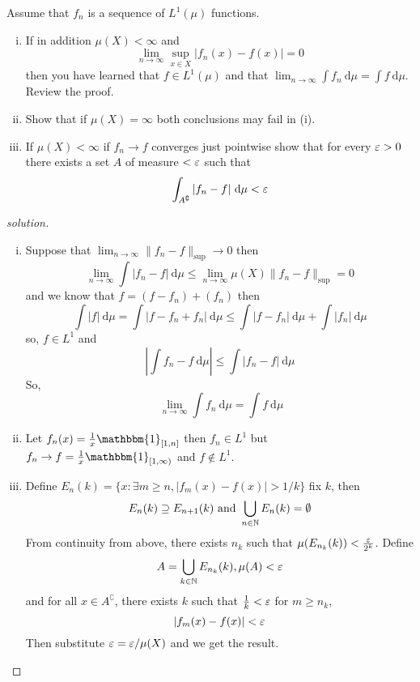 \begin{problem}
  Assume that $f_n$ is a sequence of $L^1(\mu)$ functions.
  \begin{enumerate}[(i)]
    \item If in addition $\mu(X) < \infty$ and 
    \[\lim_{n\to\infty}\sup_{x \in X} |f_n(x) - f(x)| = 0\]
    then you have learned that $f \in L^1(\mu)$ and that $\lim_{n\to\infty}\int f_n \ \mathrm{d}\mu = \int f\ \mathrm{d}\mu$.
    Review the proof.
    \item Show that if $\mu(X) = \infty$ both conclusions may fail in (i).
    \item If $\mu(X) < \infty$ if $f_n \to f$ converges just pointwise show that for every $\varepsilon > 0$
    there exists a set $A$ of measure $< \varepsilon$ such that 
    \[\int_{A^\complement} |f_n - f| \ \mathrm{d}\mu < \varepsilon\]
  \end{enumerate}
\end{problem}
\begin{proof}[solution]
  \begin{enumerate}[(i)]
    \item Suppose that $\lim_{n\to\infty} \|f_n - f\|_{\sup} \to 0$ then 
    \[\lim_{n\to\infty}\int |f_n - f| \ \mathrm{d}\mu \le \lim_{n\to\infty}\mu(X)\|f_n - f\|_{\sup} = 0\]
    and we know that $f = (f - f_n) + (f_n)$ then
    \[\int |f| \ \mathrm{d}\mu = \int |f - f_n + f_n| \ \mathrm{d}\mu \le \int |f - f_n| \ \mathrm{d}\mu + \int |f_n| \ \mathrm{d}\mu\]
    so, $f \in L^1$ and 
    \[\left| \int f_n - f \ \mathrm{d}\mu\right|\le \int |f_n - f| \ \mathrm{d}\mu\]
    So, 
    \[\ \lim_{n\to\infty}\int f_n\ \mathrm{d}\mu = \int f \ \mathrm{d}\mu\]
    \item Let $f_n(x) = \frac1x\mathbbm{1}_{[1, n]}$ then $f_n \in L^1$ but $f_n \to f = \frac{1}x\mathbbm{1}_{[1, \infty)}$ and $f \not\in L^1$.
    \item Define $E_n(k) = \{x : \exists m \ge n, |f_m(x) - f(x)| > 1/k\}$ fix $k$, then 
    \[E_n(k) \supseteq E_{n+1}(k) \text{ and } \bigcup_{n \in \mathbb N} E_n(k) = \emptyset\]
    From continuity from above, there exists $n_k$ such that $\mu(E_{n_k}(k)) < \frac{\varepsilon}{2^k}$.
    Define 
    \[A = \bigcup_{k \in \mathbb N} E_{n_k}(k), \mu(A) < \varepsilon\]
    and for all $x \in A^\complement$, there exists $k$ such that $\frac1k < \varepsilon$ for $m \ge n_k$,
    \[|f_m(x) - f(x)| < \varepsilon\]
    Then substitute $\varepsilon = \varepsilon / \mu(X)$ and we get the result.
  \end{enumerate}
\end{proof}

